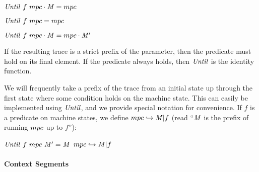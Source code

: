 \documentclass[acmsmall,review,anonymous]{acmart}\settopmatter{printfolios=true,printccs=false,printacmref=false}
\begin{document}
\begin{center}
  \begin{minipage}{.3\textwidth}
             {\(\mathit{Until} ~ f ~ mpc \cdot \mathit{M} = mpc\)}
  \end{minipage}
%
  \begin{minipage}{.3\textwidth}
    \judgment{}
             {\(\mathit{Until} ~ f ~ mpc = mpc\)}
%
  \end{minipage}
  \begin{minipage}{.3\textwidth}
                {\(\mathit{Until} ~ f ~ mpc \cdot \mathit{M} = mpc \cdot \mathit{M}'\)}
  \end{minipage}
\end{center}
%
If the resulting trace is a strict prefix of the parameter, then the
predicate must hold on its final element. If the predicate always holds, then
\(\mathit{Until}\) is the identity function.

We will frequently take a prefix of the trace from an initial state up
through the first state where some condition holds on the machine state.
This can easily be implemented using \(\mathit{Until}\), and we provide special notation
for convenience.
%
If \(f\) is a predicate on machine states, we define \(mpc
\hookrightarrow \mathit{M} | f\) (read ``\(\mathit{M}\) is the prefix of
running \(mpc\) up to \(f\)''):
%
\begin{center}
            {\(\mathit{Until} ~ f ~ mpc ~ \mathit{M}' = \mathit{M}\)}
            {\(mpc \hookrightarrow \mathit{M} | f\)}
\end{center}

\paragraph*{Context Segments}
\end{document}
